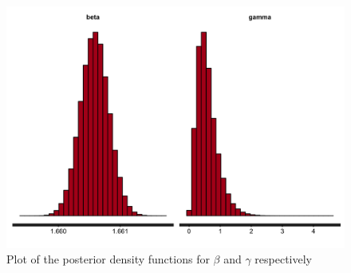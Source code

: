 \documentclass{article}
\begin{document}
\begin{figure}[htbp]
\includegraphics[scale=.25, center]{ChainBinomBayesDensity.png}
\caption{Plot of the posterior density functions for $\beta$ and $\gamma$ respectively}
\label{fig:ChainBinomBayesDensity}
\end{figure}
\end{document}
